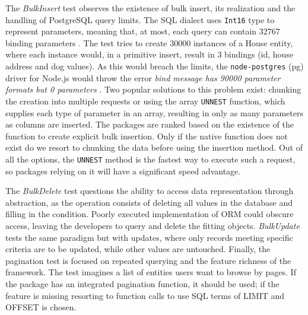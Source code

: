 The \textit{BulkInsert} test observes the existence of bulk insert, its
realization and the handling of PostgreSQL query limits. The SQL dialect uses
\texttt{Int16} type to represent parameters, meaning that, at most, each query
can contain 32767 binding parameters \cite{postgresMessageFormats}. The test
tries to create 30000 instances of a House entity, where each instance would, in
a primitive insert, result in 3 bindings (id, house address and dog values). As
this would breach the limits, the \texttt{node-postgres} (pg) driver for Node.js
would throw the error \textit{bind message has 90000 parameter formats but 0
parameters} \cite{nodePostgresParameterLimit}. Two popular solutions to this
problem exist: chunking the creation into multiple requests or using the array
\texttt{UNNEST} function, which supplies each type of parameter in an array,
resulting in only as many parameters as columns are inserted. The packages are
ranked based on the existence of the function to create explicit bulk insertion.
Only if the native function does not exist do we resort to chunking the data
before using the insertion method. Out of all the options, the \texttt{UNNEST}
method is the fastest way to execute such a request, so packages relying on it
will have a significant speed advantage.

The \textit{BulkDelete} test questions the ability to access data representation
through abstraction, as the operation consists of deleting all values in the
database and filling in the condition. Poorly executed implementation of ORM
could obscure access, leaving the developers to query and delete the fitting
objects. \textit{BulkUpdate} tests the same paradigm but with updates, where
only records meeting specific criteria are to be updated, while other values are
untouched. Finally, the pagination test is focused on repeated querying and the
feature richness of the framework. The test imagines a list of entities users
want to browse by pages. If the package has an integrated pagination function,
it should be used; if the feature is missing resorting to function calls to use
SQL terms of LIMIT and OFFSET is chosen.
